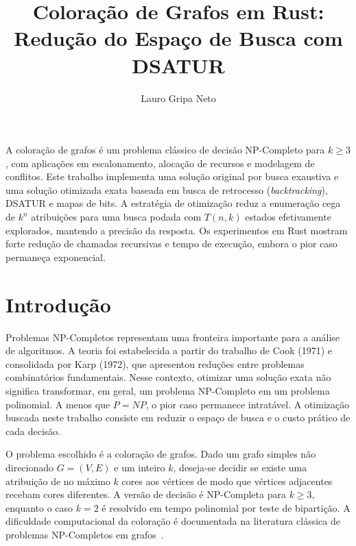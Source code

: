 \documentclass[12pt]{article}
\title{Coloração de Grafos em Rust:\\Redução do Espaço de Busca com DSATUR}
\author{Lauro Gripa Neto\inst{1}}
\begin{document}
\maketitle

\thispagestyle{empty}
\pagestyle{empty}

\begin{resumo}
A coloração de grafos é um problema clássico de decisão NP-Completo para
$k \geq 3$, com aplicações em escalonamento, alocação de recursos e modelagem de
conflitos. Este trabalho implementa uma solução original por busca exaustiva e
uma solução otimizada exata baseada em busca de retrocesso (\textit{backtracking}), DSATUR e mapas de
bits. A
estratégia de otimização reduz a enumeração cega de $k^n$ atribuições para uma
busca podada com $T(n,k)$ estados efetivamente explorados, mantendo a precisão da
resposta. Os experimentos em Rust mostram forte redução de chamadas recursivas e
tempo de execução, embora o pior caso permaneça exponencial.
\end{resumo}
\vspace{0.5\baselineskip}

\section{Introdução}

Problemas NP-Completos representam uma fronteira importante para a análise de
algoritmos. A teoria foi estabelecida a partir do trabalho de Cook (1971) e
consolidada por Karp (1972), que apresentou reduções entre problemas
combinatórios fundamentais. Nesse
contexto, otimizar uma solução exata não significa transformar, em geral, um
problema NP-Completo em um problema polinomial. A menos que $P=NP$, o pior caso
permanece intratável. A otimização buscada neste trabalho consiste em reduzir o
espaço de busca e o custo prático de cada decisão.

O problema escolhido é a coloração de grafos. Dado um grafo simples não
direcionado $G=(V,E)$ e um inteiro $k$, deseja-se decidir se existe uma
atribuição de no máximo $k$ cores aos vértices de modo que vértices adjacentes
recebam cores diferentes. A versão de decisão é NP-Completa para $k \geq 3$,
enquanto o caso $k=2$ é resolvido em tempo polinomial por teste de bipartição.
A dificuldade computacional da coloração é documentada na literatura clássica de
problemas NP-Completos em grafos~\cite{garey1976simplified}.
\end{document}
